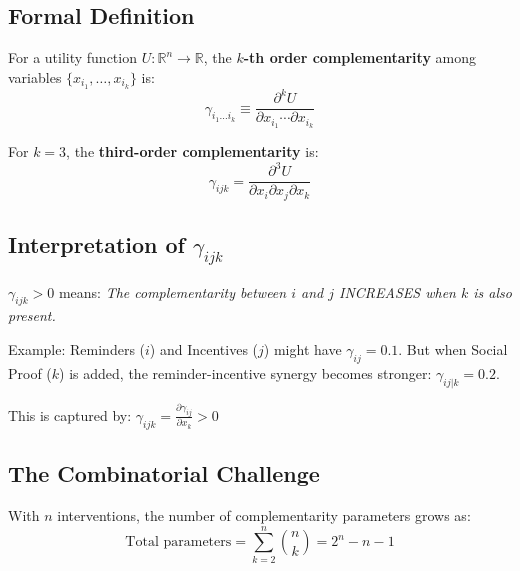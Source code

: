 \subsection{Formal Definition}

\begin{definition}
For a utility function $U: \mathbb{R}^n \to \mathbb{R}$, the \textbf{$k$-th order complementarity} among variables $\{x_{i_1}, \ldots, x_{i_k}\}$ is:
\begin{equation}
\gamma_{i_1 \ldots i_k} \equiv \frac{\partial^k U}{\partial x_{i_1} \cdots \partial x_{i_k}}
\label{eq:higher-order-gamma}
\end{equation}
\end{definition}

For $k = 3$, the \textbf{third-order complementarity} is:
\begin{equation}
\gamma_{ijk} = \frac{\partial^3 U}{\partial x_i \partial x_j \partial x_k}
\end{equation}

\subsection{Interpretation of $\gamma_{ijk}$}

\begin{tcolorbox}[colback=yellow!5!white,colframe=yellow!75!black,title=\textbf{Intuition}]
$\gamma_{ijk} > 0$ means: \textit{The complementarity between $i$ and $j$ INCREASES when $k$ is also present.}

Example: Reminders ($i$) and Incentives ($j$) might have $\gamma_{ij} = 0.1$. But when Social Proof ($k$) is added, the reminder-incentive synergy becomes stronger: $\gamma_{ij|k} = 0.2$.

This is captured by: $\gamma_{ijk} = \frac{\partial \gamma_{ij}}{\partial x_k} > 0$
\end{tcolorbox}

\subsection{The Combinatorial Challenge}

\begin{theorem}
With $n$ interventions, the number of complementarity parameters grows as:
\begin{equation}
\text{Total parameters} = \sum_{k=2}^{n} \binom{n}{k} = 2^n - n - 1
\end{equation}
\end{theorem}

